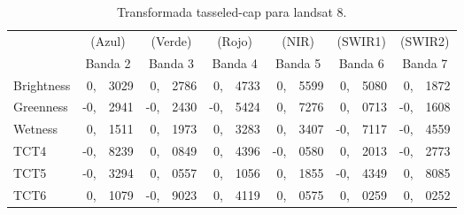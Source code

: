 \documentclass[hidelinks,12pt]{article}
\begin{document}
\begin{table}[htb]
    \centering
    \begin{tabular}{@{}lr@{}lr@{}lr@{}lr@{}lr@{}lr@{}l@{}}
        \toprule
                   & \multicolumn{2}{c}{(Azul)}  & \multicolumn{2}{c}{(Verde)} &
        \multicolumn{2}{c}{(Rojo)}  & \multicolumn{2}{c}{(NIR)}   &
        \multicolumn{2}{c}{(SWIR1)} & \multicolumn{2}{c}{(SWIR2)} \\ 
                   & \multicolumn{2}{c}{Banda 2} & \multicolumn{2}{c}{Banda 3} &
        \multicolumn{2}{c}{Banda 4} & \multicolumn{2}{c}{Banda 5} &
        \multicolumn{2}{c}{Banda 6} & \multicolumn{2}{c}{Banda 7} \\
        \midrule
        Brightness & 0,           & 3029         & 0,           & 2786         &
        0,           & 4733         & 0,           & 5599         & 0,
        & 5080         & 0,           & 1872         \\
        Greenness  & -0,          & 2941         & -0,          & 2430         &
        -0,          & 5424         & 0,           & 7276         & 0,
        & 0713         & -0,          & 1608         \\
        Wetness    & 0,           & 1511         & 0,           & 1973         &
        0,           & 3283         & 0,           & 3407         & -0,
        & 7117         & -0,          & 4559         \\
        TCT4       & -0,          & 8239         & 0,           & 0849         &
        0,           & 4396         & -0,          & 0580         & 0,
        & 2013         & -0,          & 2773         \\
        TCT5       & -0,          & 3294         & 0,           & 0557         &
        0,           & 1056         & 0,           & 1855         & -0,
        & 4349         & 0,           & 8085         \\
        TCT6       & 0,           & 1079         & -0,          & 9023         &
        0,           & 4119         & 0,           & 0575         & 0,
        & 0259         & 0,           & 0252         \\ \bottomrule
    \end{tabular}
    \caption{Transformada tasseled-cap para landsat 8.}
\end{table}
\end{document}
